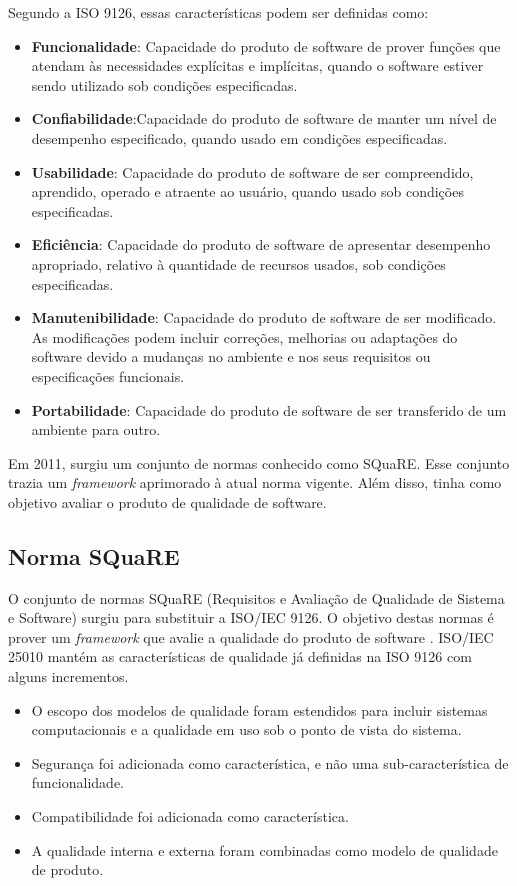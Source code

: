 Segundo a ISO 9126, essas características podem ser definidas como:
\begin{itemize}
\item \textbf{Funcionalidade}: Capacidade do produto de software de prover funções que atendam às necessidades explícitas e implícitas, quando o software estiver sendo utilizado sob condições especificadas.
\item \textbf{Confiabilidade}:Capacidade do produto de software de manter um nível de desempenho especificado, quando usado em condições especificadas.
\item \textbf{Usabilidade}: Capacidade do produto de software de ser compreendido, aprendido, operado e atraente ao usuário, quando usado sob condições especificadas.
\item \textbf{Eficiência}: Capacidade do produto de software de apresentar desempenho apropriado, relativo à quantidade de recursos usados, sob condições especificadas.
\item \textbf{Manutenibilidade}: Capacidade do produto de software de ser modificado. As modificações podem incluir correções, melhorias ou adaptações do software devido a mudanças no ambiente e nos seus requisitos ou especificações funcionais.
\item \textbf{Portabilidade}: Capacidade do produto de software de ser transferido de um ambiente para outro.
\end{itemize}

Em 2011, surgiu um conjunto de normas conhecido como SQuaRE. Esse conjunto trazia um \textit{framework} aprimorado à atual norma vigente. Além disso, tinha como objetivo avaliar o produto de qualidade de software.

\subsection{Norma SQuaRE}
O conjunto de normas SQuaRE (Requisitos e Avaliação de Qualidade de Sistema e Software) surgiu para substituir a ISO/IEC 9126. O objetivo destas normas é prover um \textit{framework} que avalie a qualidade do produto de software \cite{luiza_yago}. ISO/IEC 25010 mantém as características de qualidade já definidas na ISO 9126 com alguns incrementos.

\begin{itemize}
\item O escopo dos modelos de qualidade foram estendidos para incluir sistemas computacionais e a qualidade em uso sob o ponto de vista do sistema.
\item Segurança foi adicionada como característica, e não uma sub-característica de funcionalidade.
\item Compatibilidade foi adicionada como característica.
\item A qualidade interna e externa foram combinadas como modelo de qualidade de produto.
\end{itemize}

